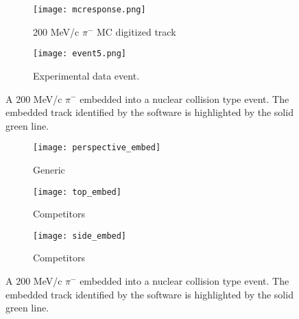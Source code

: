 
\begin{figure}[!htb]
    \centering
    \begin{subfigure}[t]{0.49\textwidth}
        \centering
        \texttt{[image: mcresponse.png]}
        \caption{200 MeV/c $\pi^-$ MC digitized track} \label{fig:mcevent}
    \end{subfigure}
    \hfill
    \begin{subfigure}[t]{.49\textwidth}
        \centering
        \texttt{[image: event5.png]} 
        \caption{Experimental data event.} \label{fig:dataevent}
    \end{subfigure}
    \caption{A 200 MeV/c $\pi^-$ embedded into a nuclear collision type event. The embedded track identified by the software is highlighted by the solid green line. }

\label{fig:embedtrack}
\end{figure}



\begin{figure}[!htb]
    \centering
    \begin{subfigure}[t]{0.49\textwidth}
        \centering
        \texttt{[image: perspective\_embed]}
        \caption{Generic} \label{fig:persEmbed}
    \end{subfigure}
    \hfill
    \begin{subfigure}[t]{.3\textwidth}
        \centering
        \texttt{[image: top\_embed]} 
        \caption{Competitors} \label{fig:topEmbed}
    \end{subfigure}
     \hfill
    \begin{subfigure}[t]{\textwidth}
        \centering
        \texttt{[image: side\_embed]} 
        \caption{Competitors} \label{fig:sideEmbed}
    \end{subfigure}
    \caption{A 200 MeV/c $\pi^-$ embedded into a nuclear collision type event. The embedded track identified by the software is highlighted by the solid green line. }

\label{fig:embedtrack}
\end{figure}


